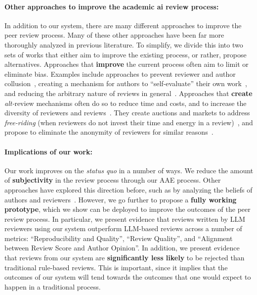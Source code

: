 \documentclass{article} %
\begin{document}
\paragraph{Other approaches to improve the academic ai review process:}
In addition to our system, there are many different approaches to improve the peer review process. Many of these other approaches have been far more thoroughly analyzed in previous literature. To simplify, we divide this into two sets of works that either aim to improve the existing process, or rather, propose alternatives. Approaches that \textbf{improve} the current process often aim to limit or eliminate bias. Examples include approaches to prevent reviewer and author collusion~\citep{wu2021making, wu2024truth, jecmen2024detection}, creating a mechanism for authors to ``self-evaluate'' their own work~\citep{su2021you, wu2023isotonic, su2024analysis}, and reducing the arbitrary nature of reviews in general~\citep{shah2022challenges}. Approaches that \textbf{create} \textit{alt-}review mechanisms often do so to reduce time and costs, and to increase the diversity of reviewers and reviews~\cite{stelmakh2021novice}. They create auctions and markets to address \textit{free-riding} (when reviewers do not invest their time and energy in a review)~\citep{frijters2019improving, srinivasan2021auctions, ugarov2023peer}, and propose to eliminate the anonymity of reviewers for similar reasons~\citep{sculley2018avoiding}.
\paragraph{Implications of our work:}
Our work improves on the \textit{status quo} in a number of ways. We reduce the amount of \textbf{subjectivity} in the review process through our AAE process. Other approaches have explored this direction before, such as by analyzing the beliefs of authors and reviewers~\cite{su2021you, su2024analysis, wu2024truth}. However, we go further to propose a \textbf{fully working prototype}, which we show can be deployed to improve the outcomes of the peer review process. In particular, we present evidence that reviews written by LLM reviewers using our system outperform LLM-based reviews across a number of metrics: ``Reproducibility and Quality'', ``Review Quality'', and ``Alignment between Review Score and Author Opinion''. In addition, we present evidence that reviews from our system are \textbf{significantly less likely} to be rejected than traditional rule-based reviews. This is important, since it implies that the outcomes of our system will tend towards the outcomes that one would expect to happen in a traditional process. 
\end{document}
